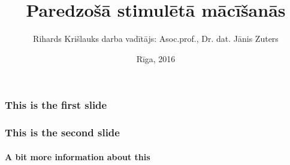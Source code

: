 \documentclass[xetex,mathserif,sans serif]{beamer}
\title{Paredzošā stimulētā mācīšanās}
\author{Rihards Krišlauks \newline \small{darba vadītājs: Asoc.prof., Dr. dat. Jānis Zuters}}
\date{Rīga, 2016}
\begin{document}
  \maketitle
  \begin{frame}
    \frametitle{This is the first slide}
  \end{frame}
  \begin{frame}
    \frametitle{This is the second slide}
    \framesubtitle{A bit more information about this}
  \end{frame}
\end{document}
